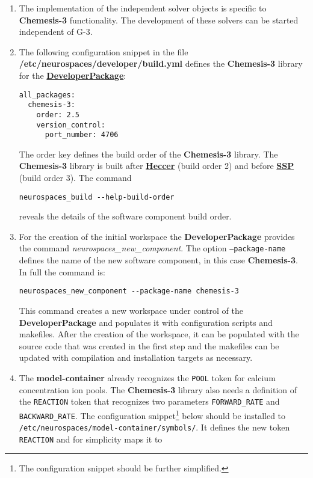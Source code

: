 \documentclass[12pt]{article}
\begin{document}
\begin{enumerate}
\item The implementation of the independent solver objects is specific
  to {\bf Chemesis-3} functionality.  The development of these solvers
  can be started independent of G-3.
\item The following configuration snippet in the file {\bf
    /etc/neurospaces/developer/build.yml} defines the {\bf Chemesis-3}
  library for the
  \href{../developer-package/developer-package.tex}{\bf
    DeveloperPackage}:
\begin{verbatim}
all_packages:
  chemesis-3:
    order: 2.5
    version_control:
      port_number: 4706
\end{verbatim}
  The order key defines the build order of the {\bf Chemesis-3} library.
  The {\bf Chemesis-3} library is built after
  \href{../heccer/heccer.tex}{\bf Heccer} (build order 2) and before
  \href{../ssp/ssp.tex}{\bf SSP} (build order 3).  The command
\begin{verbatim}
neurospaces_build --help-build-order
\end{verbatim}
  reveals the details of the software component build order.
\item For the creation of the initial workspace the {\bf
    DeveloperPackage} provides the command {\it
    neurospaces\_new\_component}.  The option {\tt --package-name}
  defines the name of the new software component, in this case {\bf
    Chemesis-3}.  In full the command is:
\begin{verbatim}
neurospaces_new_component --package-name chemesis-3
\end{verbatim}
  This command creates a new workspace under control of the {\bf
    DeveloperPackage} and populates it with configuration scripts and
  makefiles.  After the creation of the workspace, it can be populated
  with the source code that was created in the first step and the
  makefiles can be updated with compilation and installation targets
  as necessary.
\item The {\bf model-container} already recognizes the {\tt POOL}
  token for calcium concentration ion pools.  The {\bf Chemesis-3}
  library also needs a definition of the {\tt REACTION} token that
  recognizes two parameters {\tt FORWARD\_RATE} and {\tt
    BACKWARD\_RATE}.  The configuration snippet\footnote{The
    configuration snippet should be further simplified.} below should
  be installed to {\tt /etc/neurospaces/model-container/symbols/}.  It
  defines the new token {\tt REACTION} and for simplicity maps it to

\end{enumerate}
\end{document}
